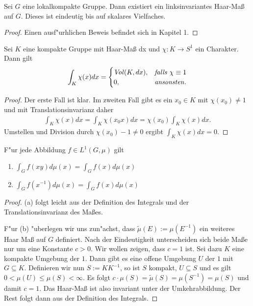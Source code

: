 	\begin{satz}\label{Satz:LCAMeasure}
		Sei $G$ eine lokalkompakte Gruppe. Dann existiert ein linksinvariantes Haar-Maß auf $G$. Dieses ist eindeutig bis auf skalares Vielfaches.
	\end{satz}
	\begin{proof}
		Einen ausf"urhlichen Beweis befindet sich in \cite{rama} Kapitel 1.
	\end{proof}
	
	\begin{lemma}\label{Lemma:trivialerCharAufKompakt}
		Sei $K$ eine kompakte Gruppe mit Haar-Maß dx und $\chi: K \to S^1$ ein Charakter. Dann gilt
		\begin{align*}
			\int_K \chi(x) dx = 
				\begin{cases}
					\text{\emph{Vol}}(K, dx),	& \text{\emph{falls} } \chi\equiv 1\\
					0,					& \text{\emph{ansonsten.}}
				\end{cases}
		\end{align*}
	\end{lemma}
	\begin{proof}
		Der erste Fall ist klar. Im zweiten Fall gibt es ein $x_0 \in K$ mit $\chi(x_0) \not=1$ und mit Translationsinvarianz daher
		\begin{align*}
			\int_K \chi(x)dx = \int_K\chi(x_0x)dx = \chi(x_0)\int_K\chi(x)dx.
		\end{align*}
		Umstellen und Division durch $\chi(x_0) - 1 \not=0$ ergibt $\int_K \chi(x)dx = 0$.
	\end{proof}
	
	\begin{lemma}F"ur jede Abbildung $f\in L^{1}(G,\mu)$ gilt
		\begin{enumerate}[label=\emph{(\alph*)}]
			\item $\int_{G} f(xy)d\mu(x) = \int_{G} f(x)d\mu(x)$
			\item $\int_{G} f(x^{-1})d\mu(x) = \int_{G} f(x)d\mu(x)$
		\end{enumerate}
	\end{lemma}
	\begin{proof}
		(a) folgt leicht aus der Definition des Integrals und der Translationsinvarianz des Maßes.
		
		F"ur (b) "uberlegen wir uns zun"achst, dass $\tilde{\mu}(E):= \mu(E^{-1})$ ein weiteres Haar Maß auf $G$ definiert. Nach der Eindeutigkeit unterscheiden sich beide Maße nur um eine Konstante $c > 0$. Wir wollen zeigen, dass $c=1$ ist.
		Sei dazu $K$ eine kompakte Umgebung der $1$. Dann gibt es eine offene Umgebung $U$ der $1$ mit $G \subseteq K$. Definieren wir nun $S := KK^{-1}$, so ist $S$ kompakt, $U \subseteq S$ und es gilt $0 < \mu(U) \leq \mu(S)<\infty$. 
		Es folgt $ c\cdot \mu(S) = \tilde{\mu}(S) = \mu(S^{-1}) =\mu(S)$ und damit $c=1$. Das Haar-Maß ist also invariant unter der Umkehrabbildung. Der Rest folgt dann aus der Definition des Integrals.
	\end{proof}